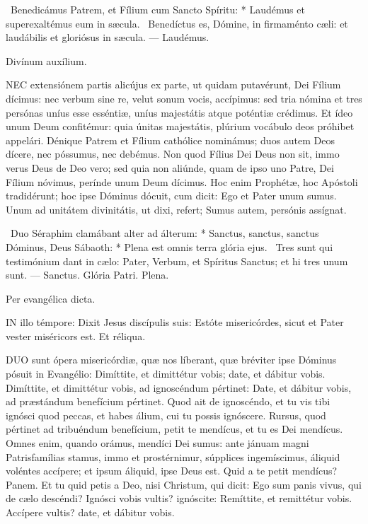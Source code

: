 \R\ Benedicámus Patrem, et Fílium cum Sancto Spíritu: * Laudémus et superexaltémus eum in sæcula. \V\ Benedíctus es, Dómine, in firmaménto cæli: et laudábilis et gloriósus in sæcula. --- Laudémus.

 Divínum auxílium.


\lettrine[lines=2]{N}{EC} extensiónem partis alicújus ex parte, ut quidam putavérunt, Dei Fílium dícimus: nec verbum sine re, velut sonum vocis, accípimus: sed tria nómina et tres persónas uníus esse esséntiæ, uníus majestátis atque poténtiæ crédimus. Et ídeo unum Deum confitémur: quia únitas majestátis, plúrium vocábulo deos próhibet appelári. Dénique Patrem et Fílium cathólice nominámus; duos autem Deos dícere, nec póssumus, nec debémus. Non quod Fílius Dei Deus non sit, immo verus Deus de Deo vero; sed quia non aliúnde, quam de ipso uno Patre, Dei Fílium nóvimus, perínde unum Deum dícimus. Hoc enim Prophétæ, hoc Apóstoli tradidérunt; hoc ipse Dóminus dócuit, cum dicit: Ego et Pater unum sumus. Unum ad unitátem divinitátis, ut dixi, refert; Sumus autem, persónis assígnat.

\R\ Duo Séraphim clamábant alter ad álterum: * Sanctus, sanctus, sanctus Dóminus, Deus Sábaoth: * Plena est omnis terra glória ejus. \V\ Tres sunt qui testimónium dant in cælo: Pater, Verbum, et Spíritus Sanctus; et hi tres unum sunt. --- Sanctus. Glória Patri. Plena.

 Per evangélica dicta.



\lettrine[lines=2]{I}{N} illo témpore: Dixit Jesus discípulis suis: Estóte misericórdes, sicut et Pater vester miséricors est. Et réliqua.



\lettrine[lines=2]{D}{UO} sunt ópera misericórdiæ, quæ nos líberant, quæ bréviter ipse Dóminus pósuit in Evangélio: Dimíttite, et dimittétur vobis; date, et dábitur vobis. Dimíttite, et dimittétur vobis, ad ignoscéndum pértinet: Date, et dábitur vobis, ad præstándum benefícium pértinet. Quod ait de ignoscéndo, et tu vis tibi ignósci quod peccas, et habes álium, cui tu possis ignóscere. Rursus, quod pértinet ad tribuéndum benefícium, petit te mendícus, et tu es Dei mendícus. Omnes enim, quando orámus, mendíci Dei sumus: ante jánuam magni Patrisfamílias stamus, immo et prostérnimur, súpplices ingemíscimus, áliquid voléntes accípere; et ipsum áliquid, ipse Deus est. Quid a te petit mendícus? Panem. Et tu quid petis a Deo, nisi Christum, qui dicit: Ego sum panis vivus, qui de cælo descéndi? Ignósci vobis vultis? ignóscite: Remíttite, et remittétur vobis. Accípere vultis? date, et dábitur vobis.

